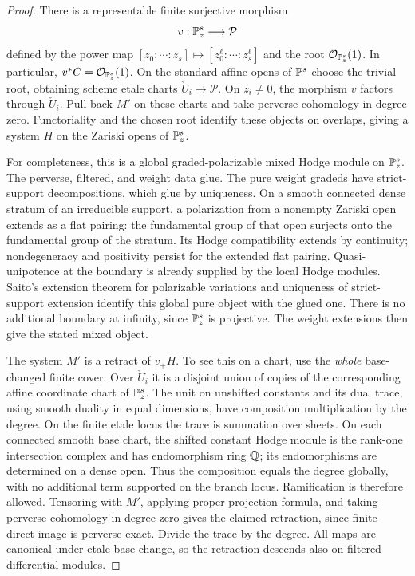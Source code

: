 \begin{proof}
There is a representable finite surjective morphism
\[
 v:\mathbb{P}^s_z\longrightarrow\mathcal P
\]
defined by the power map
\([z_0:\cdots:z_s]\mapsto[z_0^\ell:\cdots:z_s^\ell]\)
and the root \(\mathcal{O}_{\mathbb{P}^s_z}(1)\).  In particular,
\(v^*C=\mathcal{O}_{\mathbb{P}^s_z}(1)\).  On the standard affine opens of \(\mathbb{P}^s\)
choose the trivial root, obtaining scheme etale charts
\(\check U_i\to\mathcal P\).  On \(z_i\ne0\), the morphism \(v\)
factors through \(\check U_i\).  Pull back \(M'\) on these charts
and take perverse cohomology in degree zero.  Functoriality and the
chosen root identify these objects on overlaps, giving a system
\(H\) on the Zariski opens of \(\mathbb{P}^s_z\).

For completeness, this is a global graded-polarizable mixed Hodge
module on \(\mathbb{P}^s_z\).  The perverse, filtered, and weight data glue.
The pure weight gradeds have strict-support decompositions, which
glue by uniqueness.  On a smooth connected dense stratum of an
irreducible support, a polarization from a nonempty Zariski open
extends as a flat pairing: the fundamental group of that open
surjects onto the fundamental group of the stratum.  Its Hodge
compatibility extends by continuity; nondegeneracy and positivity
persist for the extended flat pairing.  Quasi-unipotence at the
boundary is already supplied by the local Hodge modules.  Saito's
extension theorem for polarizable variations
\cite[Section~3.b]{Proj-Saito1990} and uniqueness of strict-support
extension identify this global pure object with the glued one.
There is no additional boundary at infinity, since \(\mathbb{P}^s_z\) is
projective.  The weight extensions then give the stated mixed
object.

The system \(M'\) is a retract of \(v_+H\).  To see this on a chart,
use the \emph{whole} base-changed finite cover.  Over \(\check U_i\)
it is a disjoint union of copies of the corresponding affine
coordinate chart of \(\mathbb{P}^s_z\).  The unit on unshifted constants
and its dual trace, using smooth duality in equal dimensions, have
composition multiplication by the degree.  On the finite etale
locus the trace is summation over sheets.  On each connected
smooth base chart, the shifted constant Hodge module is the
rank-one intersection complex and has endomorphism ring \(\mathbb{Q}\);
its endomorphisms are determined on a dense open.  Thus the
composition equals the degree globally, with no additional term
supported on the branch locus.  Ramification is therefore
allowed.  Tensoring with \(M'\), applying proper
projection formula, and taking perverse cohomology in degree zero
gives the claimed retraction, since finite direct image is
perverse exact.  Divide the trace by the degree.  All maps are
canonical under etale base change, so the retraction descends also
on filtered differential modules.


\end{proof}
